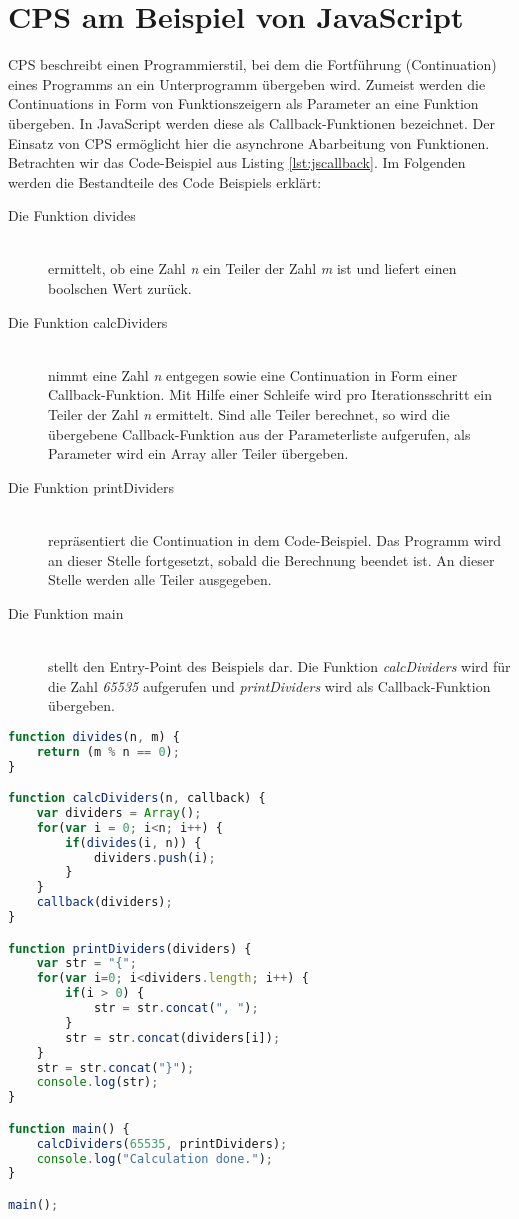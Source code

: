 \section{\acl{CPS} am Beispiel von JavaScript}
\label{sec:jscps}\acl{CPS} beschreibt einen Programmierstil, bei dem die Fortführung (Continuation) eines Programms an ein Unterprogramm übergeben wird. Zumeist werden die Continuations in Form von Funktionszeigern als Parameter an eine Funktion übergeben. In JavaScript werden diese als Callback-Funktionen bezeichnet. Der Einsatz von \acs{CPS} ermöglicht hier die asynchrone Abarbeitung von Funktionen. Betrachten wir das Code-Beispiel aus Listing \ref{lst:jscallback}. Im Folgenden werden die Bestandteile des Code Beispiels erklärt:
\begin{description}
\item[Die Funktion divides]\hfill \\
ermittelt, ob eine Zahl \textit{n} ein Teiler der Zahl \textit{m} ist und liefert einen boolschen Wert zurück.
\item[Die Funktion calcDividers]\hfill \\
nimmt eine Zahl \textit{n} entgegen sowie eine Continuation in Form einer Callback-Funktion. Mit Hilfe einer Schleife wird pro Iterationsschritt ein Teiler der Zahl \textit{n} ermittelt. Sind alle Teiler berechnet, so wird die übergebene Callback-Funktion aus der Parameterliste aufgerufen, als Parameter wird ein Array aller Teiler übergeben.
\item[Die Funktion printDividers] \hfill \\
repräsentiert die Continuation in dem Code-Beispiel. Das Programm wird an dieser Stelle fortgesetzt, sobald die Berechnung beendet ist. An dieser Stelle werden alle Teiler ausgegeben.
\item[Die Funktion main]\hfill \\
stellt den Entry-Point des Beispiels dar. Die Funktion \textit{calcDividers} wird für die Zahl \textit{65535} aufgerufen und \textit{printDividers} wird als Callback-Funktion übergeben.\\
\end{description}
\begin{lstlisting}[language=JavaScript,caption=JavaScript Callback Beispiel,label=lst:jscallback]
function divides(n, m) {
	return (m % n == 0);
}

function calcDividers(n, callback) {
	var dividers = Array();
	for(var i = 0; i<n; i++) {
		if(divides(i, n)) {
			dividers.push(i);
		}
	}
	callback(dividers);	
}

function printDividers(dividers) {
	var str = "{";
	for(var i=0; i<dividers.length; i++) {
		if(i > 0) {
			str = str.concat(", ");
		}
		str = str.concat(dividers[i]);
	}
	str = str.concat("}");
	console.log(str);
}

function main() {
	calcDividers(65535, printDividers);
	console.log("Calculation done.");
}

main();
\end{lstlisting}
